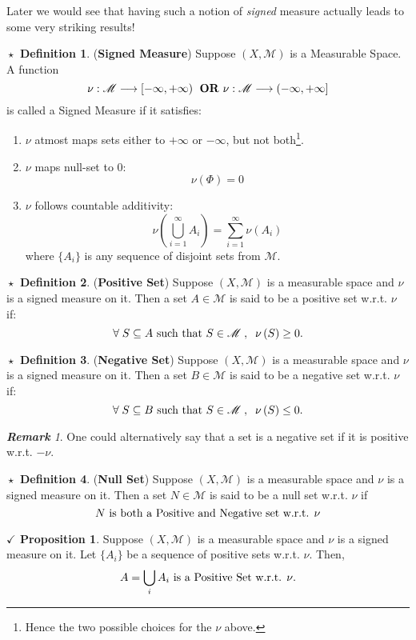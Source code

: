 \documentclass{article}
\theoremstyle{definition}
\newtheorem{definition}{$\boxed{\star}$ Definition}
\theoremstyle{remark}
\newtheorem*{remark}{\textbf{Remark}}
\theoremstyle{definition}
\theoremstyle{definition}
\newtheorem{proposition}{$\checkmark$ Proposition}
\theoremstyle{definition}
\newcommand{\bunion}{\bigcup}
\newcommand{\alg}[1]{\mathscr{#1}}
\newcommand{\sm}[1]{\nu\left (#1\right )}
\begin{document}
Later we would see that having such a notion of \emph{signed} measure actually leads to some very striking results!
\begin{definition}
	(\textbf{Signed Measure}) Suppose $ (X,\alg{M}) $ is a Measurable Space. A function 
	\[\nu : \alg{M} \longrightarrow [-\infty,+\infty) \;\text{ \textbf{OR} }\nu : \alg{M} \longrightarrow (-\infty,+\infty]\]
	is called a Signed Measure if it satisfies:
	\begin{enumerate}
		\item {$ \nu $ atmost maps sets either to $ +\infty $ or $ -\infty $, but not both\footnote{Hence the two possible choices for the $ \nu $ above.}.}
		\item {$ \nu $ maps null-set to $ 0 $:
	\[\sm{\Phi} = 0\]	
	}
\item {$ \nu $ follows countable additivity:
\[\sm{\bunion_{i=1}^{\infty} A_i} = \sum_{i=1}^{\infty} \sm{A_i}\]}
where $ \{A_i\} $ is any sequence of disjoint sets from $ \alg{M} $.
	\end{enumerate}
\end{definition} 
\hrulefill
\begin{definition}
	(\textbf{Positive Set}) Suppose $ (X,\alg{M}) $ is a measurable space and $ \nu $ is a signed measure on it. Then a set $ A \in \alg{M} $ is said to be a positive set w.r.t. $ \nu $ if:
	\[\forall \;S\subseteq A\text{ such that $ S\in \alg{M} $}\;,\;\;\sm{S} \ge 0.\]
\end{definition}
\hrulefill
\begin{definition}
	(\textbf{Negative Set}) Suppose $ (X,\alg{M}) $ is a measurable space and $ \nu $ is a signed measure on it. Then a set $ B \in \alg{M} $ is said to be a negative set w.r.t. $ \nu $ if:
	\[\forall \;S\subseteq B\text{ such that $ S\in \alg{M} $}\;,\;\;\sm{S} \le 0.\]
\end{definition}
\begin{remark}
	One could alternatively say that a set  is a negative set if it is positive w.r.t. $ -\nu $.
\end{remark}
\hrulefill
\begin{definition}
	(\textbf{Null Set}) Suppose $ (X,\alg{M}) $ is a measurable space and $ \nu $ is a signed measure on it. Then a set $ N \in \alg{M} $ is said to be a null set w.r.t. $ \nu $ if 
	\[\text{$ N $ is both a Positive and Negative set w.r.t. $ \nu $}\]
\end{definition}
\hrulefill
\begin{proposition}
	Suppose $ (X,\alg{M}) $ is a measurable space and $ \nu  $ is a signed measure on it. Let $ \{A_i\} $ be a sequence of positive sets w.r.t. $ \nu $. Then,
	\[A= \bunion_{i}A_i \text{ is a Positive Set w.r.t. $ \nu $.}\]	
\end{proposition}
\end{document}
